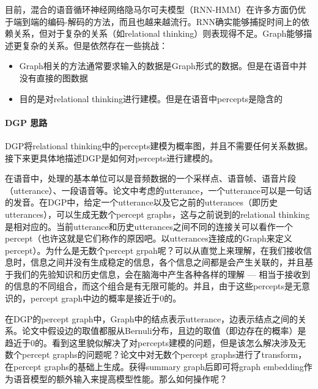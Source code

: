 目前，混合的语音循环神经网络隐马尔可夫模型（RNN-HMM）在许多方面仍优于端到端的编码-解码的方法，而且也越来越流行。RNN确实能够捕捉时间上的依赖关系，但对于复杂的关系（如relational thinking）则表现得不足。Graph能够描述更复杂的关系。但是依然存在一些挑战：
\begin{itemize}
	\item Graph相关的方法通常要求输入的数据是Graph形式的数据。但是在语音中并没有直接的图数据
	\item 目的是对relational thinking进行建模。但是在语音中percepts是隐含的
\end{itemize}


\paragraph{DGP 思路}DGP将relational thinking中的percepts建模为概率图，并且不需要任何关系数据。接下来更具体地描述DGP是如何对percepts进行建模的。

在语音中，处理的基本单位可以是音频数据的一个采样点、语音帧、语音片段（utterance）、一段语音等。论文中考虑的utterance，一个utterance可以是一句话的发音。在DGP中，给定一个utterance以及它之前的utterances（即历史utterances），可以生成无数个percept graphs，这与之前说到的relational thinking是相对应的。当前utterance和历史utterances之间不同的连接关可以看作一个percept（也许这就是它们称作的原因吧。以utterances连接成的Graph来定义percept）。为什么是无数个percept grpah呢？可以从直觉上来理解，在我们接收信息时，信息之间并没有生成稳定的信息，各个信息之间都是会产生关联的，并且基于我们的先验知识和历史信息，会在脑海中产生各种各样的理解 --- 相当于接收到的信息的不同组合，而这个组合是有无限可能的。并且，由于这些percepts是无意识的，percept graph中边的概率是接近于0的。

在DGP的percept graph中，Graph中的结点表示utterance，边表示结点之间的关系。论文中假设边的取值都服从Bernuli分布，且边的取值（即边存在的概率）是趋近于0的。看到这里貌似解决了对percepts建模的问题，但是该怎么解决涉及无数个percept graphs的问题呢？论文中对无数个percept graphs进行了transform，在percept graphs的基础上生成。获得summary graph后即可将graph embedding作为语音模型的额外输入来提高模型性能。那么如何操作呢？

